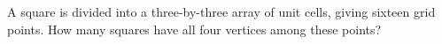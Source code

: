 A square is divided into a three-by-three array of unit cells, giving sixteen grid points. How many squares have all four vertices among these points?
